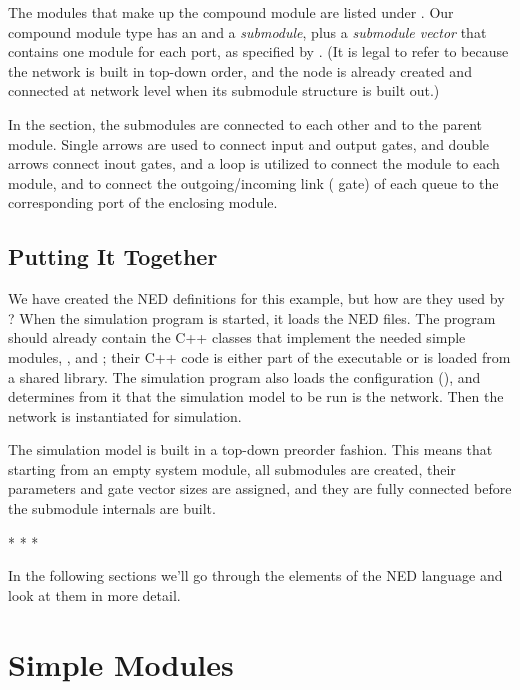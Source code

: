 The modules that make up the compound module are listed under
. Our  compound module type has an  and
a  \textit{submodule}, plus a  \textit{submodule
vector} that contains one  module for each port, as specified by
. (It is legal to refer to  because
the network is built in top-down order, and the node is already created and
connected at network level when its submodule structure is built out.)

In the  section, the submodules are connected to each
other and to the parent module. Single arrows are used to connect input and
output gates, and double arrows connect inout gates, and a  loop
is utilized to connect the  module to each  module, and
to connect the outgoing/incoming link ( gate) of each queue to the
corresponding port of the enclosing module.


\subsection{Putting It Together}

We have created the NED definitions for this example, but how are they used by {\opp}? When
the simulation program is started, it loads the NED files. The program
should already contain the C++ classes that implement the needed simple
modules, ,  and ; their C++ code is either
part of the executable or is loaded from a shared library. The simulation
program also loads the configuration (), and determines
from it that the simulation model to be run is the  network.
Then the network is instantiated for simulation.

The simulation model is built in a top-down preorder fashion. This means
that starting from an empty system module, all submodules are created,
their parameters and gate vector sizes are assigned, and they are fully connected
before the submodule internals are built.

\bigskip
\begin{center}
* * *
\end{center}
\bigskip

In the following sections we'll go through the elements of the NED
language and look at them in more detail.



\section{Simple Modules}
\label{sec:ch-ned-lang:simple-modules}

